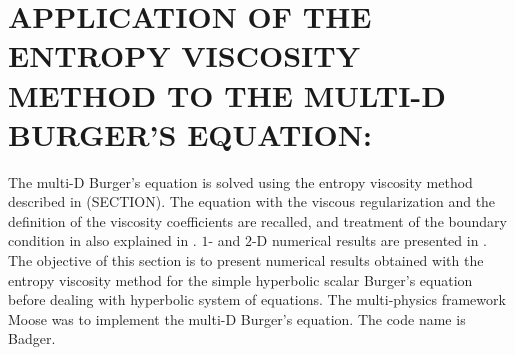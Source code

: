 %
%
%

\chapter{\uppercase {Application of the entropy viscosity method to the multi-D Burger's equation:}}\label{chap:burger_chap3}
The multi-D Burger's equation is solved using the entropy viscosity method described in (SECTION). The equation with the viscous regularization and the definition of the viscosity coefficients are recalled, and treatment of the boundary condition in also explained in . $1$- and $2$-D numerical results are presented in . The objective of this section is to present numerical results obtained with the entropy viscosity method for the simple hyperbolic scalar Burger's equation before dealing with hyperbolic system of equations. The multi-physics framework Moose \cite{Moose} was to implement the multi-D Burger's equation. The code name is Badger.

